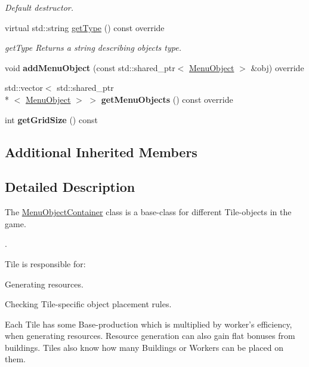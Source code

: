 \begin{DoxyCompactItemize}
\begin{DoxyCompactList}\small\item\em Default destructor. \end{DoxyCompactList}\item 
virtual std\-::string \hyperlink{class_student_1_1_menu_object_container_aca16734d7c1a5d4445dd8984e5e75463}{get\-Type} () const override
\begin{DoxyCompactList}\small\item\em get\-Type Returns a string describing objects type. \end{DoxyCompactList}\item 
\hypertarget{class_student_1_1_menu_object_container_a1ffc0d949a81eff45d51cd1a5d37f738}{void {\bfseries add\-Menu\-Object} (const std\-::shared\-\_\-ptr$<$ \hyperlink{class_student_1_1_menu_object}{Menu\-Object} $>$ \&obj) override}\label{class_student_1_1_menu_object_container_a1ffc0d949a81eff45d51cd1a5d37f738}

\item 
\hypertarget{class_student_1_1_menu_object_container_af9c513de5b3cb1e67dc27914cbd6f8e2}{std\-::vector$<$ std\-::shared\-\_\-ptr\\*
$<$ \hyperlink{class_student_1_1_menu_object}{Menu\-Object} $>$ $>$ {\bfseries get\-Menu\-Objects} () const override}\label{class_student_1_1_menu_object_container_af9c513de5b3cb1e67dc27914cbd6f8e2}

\item 
\hypertarget{class_student_1_1_menu_object_container_a3235d0025143ad600b429ea43826ba4d}{int {\bfseries get\-Grid\-Size} () const }\label{class_student_1_1_menu_object_container_a3235d0025143ad600b429ea43826ba4d}

\end{DoxyCompactItemize}
\subsection*{Additional Inherited Members}


\subsection{Detailed Description}
The \hyperlink{class_student_1_1_menu_object_container}{Menu\-Object\-Container} class is a base-\/class for different Tile-\/objects in the game. \par
. 

Tile is responsible for\-:
\begin{DoxyItemize}
\item Generating resources.
\item Checking Tile-\/specific object placement rules. \par
 Each Tile has some Base-\/production which is multiplied by worker's efficiency, when generating resources. Resource generation can also gain flat bonuses from buildings. Tiles also know how many Buildings or Workers can be placed on them. 
\end{DoxyItemize}

